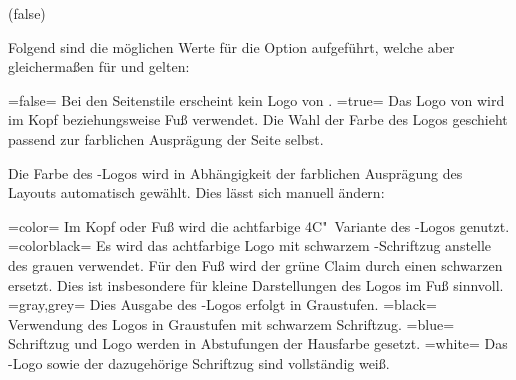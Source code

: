 \documentclass[english,ngerman,ToDo=inline,indexnote=false]{tudscrmanual}
\begin{document}
\begin{Entity}{}

\begin{Declaration}
  {}
  (false)
\begin{Declaration}
  {}
\begin{Declaration}
  {}
\printdeclarationlist
Folgend sind die möglichen Werte für die Option  aufgeführt, welche
aber gleichermaßen für  und  gelten:
\begin{DeclareValues}
\itemval=false=
  Bei den Seitenstile erscheint kein Logo von \DDC.
\itemval*=true=
  Das Logo von \DDC wird im Kopf beziehungsweise Fuß verwendet. Die Wahl der 
  Farbe des Logos geschieht passend zur farblichen Ausprägung der Seite selbst.
\end{DeclareValues}

Die Farbe des \DDC-Logos wird in Abhängigkeit der farblichen Ausprägung des 
Layouts automatisch gewählt. Dies lässt sich manuell ändern:
\begin{DeclareValues}
\itemval=color=
  Im Kopf oder Fuß wird die achtfarbige 4C"~Variante des \DDC-Logos genutzt.
\itemval=colorblack=
  Es wird das achtfarbige Logo mit schwarzem \DDC-Schriftzug anstelle des 
  grauen verwendet. Für den Fuß wird der grüne Claim durch einen schwarzen 
  ersetzt. Dies ist insbesondere für kleine Darstellungen des Logos im Fuß 
  sinnvoll.
\itemval=gray,grey=
  Dies Ausgabe des \DDC-Logos erfolgt in Graustufen.
\itemval=black=
  Verwendung des Logos in Graustufen mit schwarzem Schriftzug.
\itemval=blue=
  Schriftzug und Logo werden in Abstufungen der Hausfarbe gesetzt.
\itemval=white=
  Das \DDC-Logo sowie der dazugehörige Schriftzug sind vollständig weiß.
\end{DeclareValues}
\end{Declaration}
\end{Declaration}
\end{Declaration}





\end{Entity}
\end{document}
